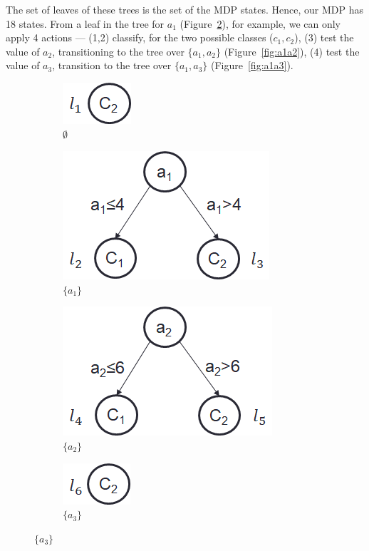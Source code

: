 \documentclass[letterpaper]{article}
\theoremstyle{definition}
\begin{document}
The set of leaves of these trees is the set of the MDP states. Hence, our MDP has 18 states. From a leaf in the tree for $a_1$ (Figure~\ref{fig:a1}), for example, we can only apply 4 actions --- (1,2) classify, for the two possible classes ($c_1,c_2$), (3) test the value of $a_2$, transitioning to the tree over $\{a_1,a_2\}$ (Figure~\ref{fig:a1a2}), (4) test the value of $a_3$, transition to the tree over $\{a_1,a_3\}$ (Figure~\ref{fig:a1a3}).

\begin{figure}[!t]
	\centering
    \hspace{-10mm}
	\begin{subfigure}[t]{0.4\linewidth}\vskip 0pt
		\centering
		\caption{$\emptyset$}\label{fig:EmpyTree}		
		\includegraphics[scale=0.4]{empty}
	\end{subfigure}
	\vspace{5mm}
    
    \hspace{-10mm}
	\begin{subfigure}[t]{0.4\linewidth}\vskip 0pt
		\centering
		\caption{$\{a_1\}$}\label{fig:a1}
		\includegraphics[scale=0.4]{a1}
	\end{subfigure}
	\quad
	\begin{subfigure}[t]{1in}\vskip 0pt
		\centering
		\caption{$\{a_2\}$}\label{fig:a2}
		\includegraphics[scale=0.4]{a2}
	\end{subfigure}
	\quad
	\begin{subfigure}[t]{1in}\vskip 0pt
		\centering
		\caption{$\{a_3\}$}\label{fig:a3}
		\includegraphics[scale=0.4]{a3}
	\end{subfigure}
	

\end{figure}
\end{document}
